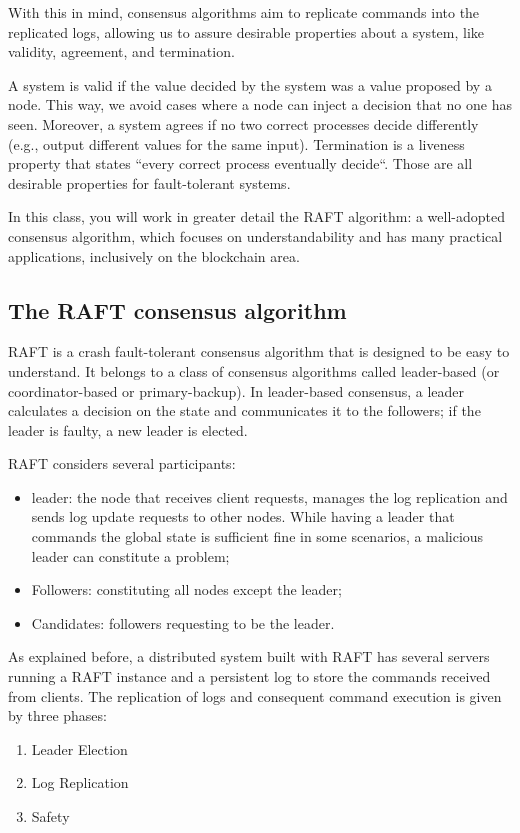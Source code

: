 \documentclass[12pt,a4paper]{article}
\begin{document}
With this in mind, consensus algorithms aim to replicate commands into the replicated logs, allowing us to assure desirable properties about a system, like validity, agreement, and termination.

A system is valid if the value decided by the system was a value proposed by a node. This way, we avoid cases where a node can inject a decision that no one has seen. Moreover, a system agrees if no two correct processes decide differently (e.g., output different values for the same input). Termination is a liveness property that states ``every correct process eventually decide``. Those are all desirable properties for fault-tolerant systems.

In this class, you will work in greater detail the RAFT algorithm: a well-adopted consensus algorithm, which focuses on understandability and has many practical applications, inclusively on the blockchain area.





\subsection{The RAFT consensus algorithm}

RAFT is a crash fault-tolerant consensus algorithm that is designed to be easy to understand.  It belongs to a class of consensus algorithms called leader-based (or coordinator-based or primary-backup). In leader-based consensus, a leader calculates a decision on the state and communicates it to the followers; if the leader is faulty, a new leader is elected.

RAFT considers several participants:
\begin{itemize}
\item leader: the node that receives client requests, manages the log replication and sends log update requests to other nodes. While having a leader that commands the global state is sufficient fine in some scenarios, a malicious leader can constitute a problem;
\item  Followers: constituting all nodes except the leader;
\item Candidates: followers requesting to be the leader.
\end{itemize}


As explained before, a distributed system built with RAFT has several servers running a RAFT instance and a persistent log to store the commands received from clients. The replication of logs and consequent command execution is given by three phases:
\begin{enumerate}
\item Leader Election
\item Log Replication
\item Safety
\end{enumerate}
\end{document}
